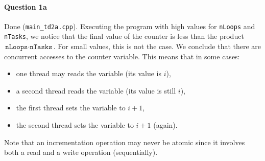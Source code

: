 \documentclass[a4paper,oneside,11pt]{article}
\begin{document}
\paragraph{Question 1a} Done (\texttt{main\_td2a.cpp}). Executing the program with high values for \texttt{nLoops} and \texttt{nTasks}, we notice that the final value of the counter is less than the product $\texttt{nLoops}\cdot\texttt{nTasks}$. For small values, this is not the case. We conclude that there are concurrent accesses to the counter variable. This means that in some cases:
\begin{itemize}
  \item  one thread may reads the variable (its value is $i$),
  \item a second thread reads the variable (its value is still $i$),
  \item the first thread sets the variable to $i+1$,
  \item the second thread sets the variable to $i+1$ (again).
\end{itemize}

Note that an incrementation operation may never be atomic since it involves both a read and a write operation (sequentially).
\end{document}
